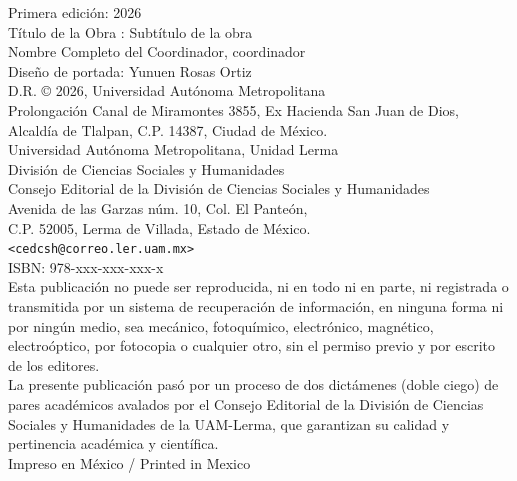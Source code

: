 \begingroup
\begin{singlespace}
\scriptsize
\noindent
Primera edición: 2026\\
Título de la Obra : Subtítulo de la obra\\
Nombre Completo del Coordinador, coordinador\\[0.5em]
Diseño de portada: Yunuen Rosas Ortiz\\[0.5em]
D.R. © 2026, Universidad Autónoma Metropolitana\\
Prolongación Canal de Miramontes 3855, Ex Hacienda San Juan de Dios,\\
Alcaldía de Tlalpan, C.P. 14387, Ciudad de México.\\[0.5em]
{\scriptsize Universidad Autónoma Metropolitana, Unidad Lerma}\\
División de Ciencias Sociales y Humanidades\\
Consejo Editorial de la División de Ciencias Sociales y Humanidades\\
Avenida de las Garzas núm. 10, Col. El Panteón,\\
C.P. 52005, Lerma de Villada, Estado de México.\\
\texttt{<cedcsh@correo.ler.uam.mx>}\\[0.8em]
ISBN: 978-xxx-xxx-xxx-x\\[0.8em]
Esta publicación no puede ser reproducida, ni en todo ni en parte, ni registrada o transmitida por un sistema de recuperación de información, en ninguna forma ni por ningún medio, sea mecánico, fotoquímico, electrónico, magnético, electroóptico, por fotocopia o cualquier otro, sin el permiso previo y por escrito de los editores.\\[0.5em]
La presente publicación pasó por un proceso de dos dictámenes (doble ciego) de pares académicos avalados por el Consejo Editorial de la División de Ciencias Sociales y Humanidades de la UAM-Lerma, que garantizan su calidad y pertinencia académica y científica.\\[0.5em]
Impreso en México / Printed in Mexico
\end{singlespace}
\endgroup
\clearpage

\clearpage
\thispagestyle{empty}
\null
\clearpage